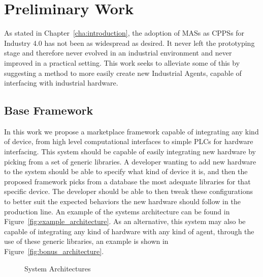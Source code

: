 

\glsresetall

\chapter{Preliminary Work}
\label{cha:preliminary_work}

As stated in Chapter~\ref{cha:introduction}, the adoption of \gls{MAS}s as \gls{CPPS}s for Industry 4.0 has not been as widespread as desired. It never left the prototyping stage and therefore never evolved in an industrial environment and never improved in a practical setting. This work seeks to alleviate some of this by suggesting a method to more easily create new Industrial Agents, capable of interfacing with industrial hardware.

\section{Base Framework}
\label{sec:base_framework}

In this work we propose a marketplace framework capable of integrating any kind of device, from high level computational interfaces to simple \gls{PLC}s for hardware interfacing. This system should be capable of easily integrating new hardware by picking from a set of generic libraries. A developer wanting to add new hardware to the system should be able to specify what kind of device it is, and then the proposed framework picks from a database the most adequate libraries for that specific device. The developer should be able to then tweak these configurations to better suit the expected behaviors the new hardware should follow in the production line. An example of the systems architecture can be found in Figure~\ref{fig:example_architecture}. As an alternative, this system may also be capable of integrating any kind of hardware with any kind of agent, through the use of these generic libraries, an example is shown in Figure~\ref{fig:bonus_architecture}.\\

\begin{figure}[h!]
	\centering
	\caption{System Architectures}
	\label{fig:system_architectures}
\end{figure}

